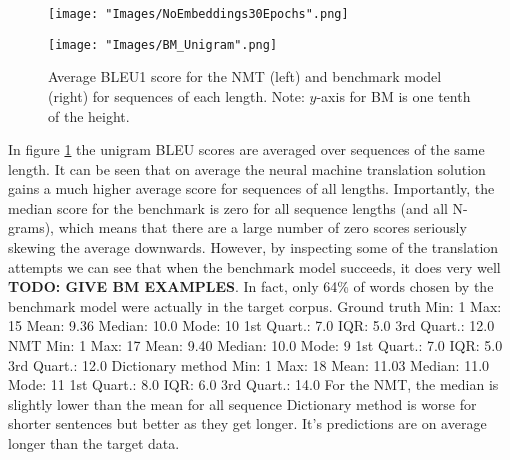 \documentclass[]{article}
\begin{document}
\begin{figure}[h]
	\centering
	\begin{minipage}[b]{0.48\textwidth}
		\texttt{[image: "Images/NoEmbeddings30Epochs".png]}
	\end{minipage}
	\begin{minipage}[b]{0.48\textwidth}
		\texttt{[image: "Images/BM\_Unigram".png]}
	\end{minipage}
	\caption{Average BLEU1 score for the NMT (left) and benchmark model (right) for sequences of each length. Note: $y$-axis for BM is one tenth of the height.}
	\label{fig:per_sequence}
\end{figure}
In figure \ref{fig:per_sequence} the unigram BLEU scores are averaged over sequences of the same length. It can be seen that on average the neural machine translation solution gains a much higher average score for sequences of all lengths. Importantly, the median score for the benchmark is zero for all sequence lengths (and all N-grams), which means that there are a large number of zero scores seriously skewing the average downwards. However, by inspecting some of the translation attempts we can see that when the benchmark model succeeds, it does very well \textbf{TODO: GIVE BM EXAMPLES}. In fact, only 64\% of words chosen by the benchmark model were actually in the target corpus. 
Ground truth
Min: 1  Max: 15  Mean: 9.36   Median: 10.0   Mode: 10   1st Quart.: 7.0   IQR: 5.0   3rd Quart.: 12.0
NMT
Min: 1  Max: 17  Mean: 9.40   Median: 10.0   Mode: 9   1st Quart.: 7.0   IQR: 5.0   3rd Quart.: 12.0
Dictionary method
Min: 1  Max: 18  Mean: 11.03   Median: 11.0   Mode: 11   1st Quart.: 8.0   IQR: 6.0   3rd Quart.: 14.0
For the NMT, the median is slightly lower than the mean for all sequence 
Dictionary method is worse for shorter sentences but better as they get longer. It's predictions are on average longer than the target data.
\end{document}
